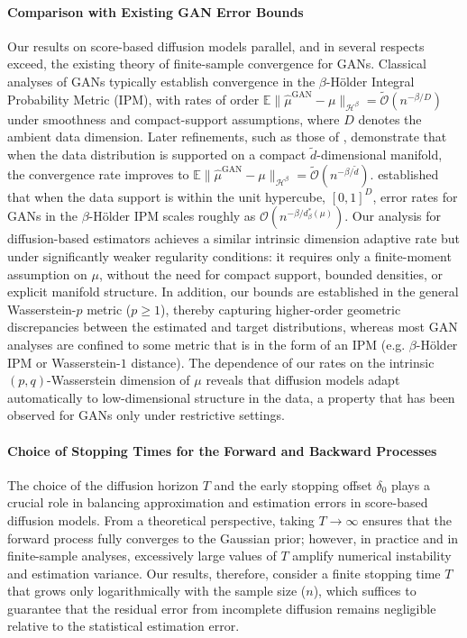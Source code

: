 \documentclass[12pts]{article}
\newcommand{\cO}{ \mathcal{O}}
\newcommand{\sH}{ \mathscr{H}}
\newcommand{\hmu}{\hat{\mu}}
\newcommand{\E}{\mathbb{E}}
\begin{document}
\paragraph{Comparison with Existing GAN Error Bounds}
Our results on score-based diffusion models parallel, and in several respects exceed, the existing theory of finite-sample convergence for GANs. Classical analyses of GANs \citep[e.g.,][]{singh2018nonparametric,uppal2019nonparametric} typically establish convergence in the $\beta$-H\"older Integral Probability Metric (IPM), with rates of order $\E \|\hmu^{\text{GAN}} - \mu\|_{\sH^\beta} = \widetilde{\cO}(n^{-\beta/D})$ under smoothness and compact-support assumptions, where $D$ denotes the ambient data dimension. Later refinements, such as those of \citet{dahal2022deep,JMLR:v23:21-0732}, demonstrate that when the data distribution is supported on a compact $\tilde{d}$-dimensional manifold, the convergence rate improves to $\E \|\hmu^{\text{GAN}} - \mu\|_{\sH^\beta} = \widetilde{\cO}\left(n^{-\beta/\tilde{d}}\right)$. \citet{JMLR:v26:24-0054} established that when the data support is within the unit hypercube, $[0,1]^D$, error rates for GANs in the $\beta$-H\"older IPM scales roughly as $\cO\left(n^{-\beta/d^\ast_\beta(\mu)}\right)$. Our analysis for diffusion-based estimators achieves a similar intrinsic dimension adaptive rate but under significantly weaker regularity conditions: it requires only a finite-moment assumption on $\mu$, without the need for compact support, bounded densities, or explicit manifold structure. In addition, our bounds are established in the general Wasserstein-$p$ metric ($p \ge 1$), thereby capturing higher-order geometric discrepancies between the estimated and target distributions, whereas most GAN analyses are confined to some metric that is in the form of an IPM (e.g. $\beta$-H\"older IPM or Wasserstein-$1$ distance). The dependence of our rates on the intrinsic $(p, q)$-Wasserstein dimension of $\mu$ reveals that diffusion models adapt automatically to low-dimensional structure in the data, a property that has been observed for GANs only under restrictive settings. 

\paragraph{Choice of Stopping Times for the Forward and Backward Processes}
The choice of the diffusion horizon $T$ and the early stopping offset $\delta_0$ plays a crucial role in balancing approximation and estimation errors in score-based diffusion models. From a theoretical perspective, taking $T \to \infty$ ensures that the forward process fully converges to the Gaussian prior; however, in practice and in finite-sample analyses, excessively large values of $T$ amplify numerical instability and estimation variance. Our results, therefore, consider a finite stopping time $T$ that grows only logarithmically with the sample size ($n$), which suffices to guarantee that the residual error from incomplete diffusion remains negligible relative to the statistical estimation error.  
\end{document}
